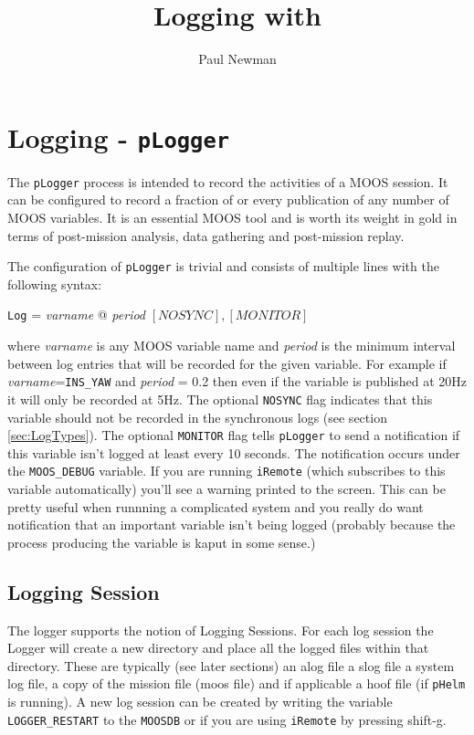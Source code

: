 \documentclass[a4paper,10pt]{article}
\title{Logging with \code{pLogger}}
\author{Paul Newman}
\newcommand{\Code}[1]{\texttt{#1} }
\newcommand{\code}[1]{\Code{#1} }
\begin{document}
\maketitle

\begin{center}
\end{center}

\section{Logging - \code{pLogger}}
The \code{pLogger} process is intended to record the activities of
a MOOS session. It can be configured to record a fraction of or
every publication of any number of MOOS variables. It is an
essential MOOS tool and is worth its weight in gold in terms of
post-mission analysis, data gathering and post-mission replay.

The configuration of \code{pLogger} is trivial and consists of
multiple lines with the following syntax:
\begin{center}
\code{Log} =  {\it{varname}} @ {\it{period}} $[NOSYNC],[MONITOR]$
\end{center}
where {\it{varname}} is any MOOS variable name and {\it{period}}
is the minimum interval between log entries that will be recorded
for the given variable. For example if
{\it{varname}}=\code{INS\_YAW} and {\it{period}} = 0.2 then even
if the variable is published at 20Hz it will only be recorded at
5Hz. The optional \code{NOSYNC} flag indicates that this variable
should not be recorded in the synchronous logs (see section
\ref{sec:LogTypes}). The optional \code{MONITOR} flag tells \code{pLogger} to send a notification if this variable isn't logged at least every 10 seconds. The notification occurs under the \code{MOOS\_DEBUG} variable. If you are running \code{iRemote} (which subscribes to this variable
automatically) you'll see a warning printed to the screen. This can be pretty useful when runnning
a complicated system and you really do want notification that an important variable isn't being logged (probably because the process producing the variable is kaput in some sense.)

\subsection{Logging Session}

The logger supports the notion of Logging Sessions. For each log session the Logger will create a new directory and place all the logged files within that directory. These are typically (see later sections) an alog file a slog file a system log file, a copy of the mission file (moos file) and if applicable a hoof file (if  \code{pHelm} is running). A new log session can be created by writing the variable \code{LOGGER\_RESTART} to the \code{MOOSDB} or if you are using \code{iRemote} by pressing shift-g.
\end{document}
